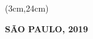 \begin{titlepage}
\begin{textblock*}{15cm}
\begin{LARGE}
        \end{LARGE}
        
    \end{textblock*}
    
    \begin{textblock*}{15cm}(3cm,24cm)
        \makeatletter
        \begin{center}
            {\color{black}
                \textbf{SÃO PAULO, 2019} 
            }
        \end{center}
        \makeatother
    \end{textblock*}

\end{titlepage}
